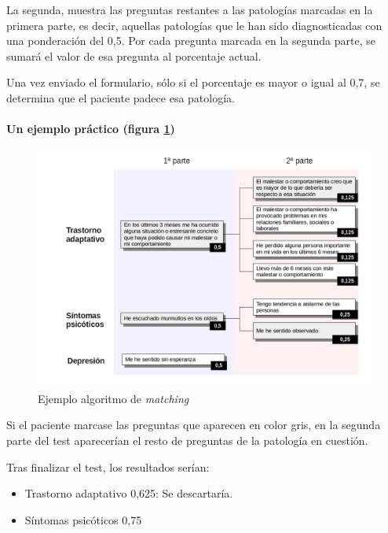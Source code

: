 La segunda, muestra las preguntas restantes a las patologías marcadas en la primera parte, es decir, aquellas patologías que le han sido diagnosticadas con una ponderación del 0,5. Por cada pregunta marcada en la segunda parte, se sumará el valor de esa pregunta al porcentaje actual.


Una vez enviado el formulario, sólo si el porcentaje es mayor o igual al 0,7, se determina que el paciente padece esa patología.


\paragraph{Un ejemplo práctico (figura \ref{ej_alg_match})}


\begin{figure}[htbp] 
    \centering
    \includegraphics[width=1\textwidth]{figuras/alg_matching.png}
    \caption{Ejemplo algoritmo de \textit{matching}}
    \label{ej_alg_match}
\end{figure}	

Si el paciente marcase las preguntas que aparecen en color gris, en la segunda parte del test aparecerían el resto de preguntas de la patología en cuestión.


Tras finalizar el test, los resultados serían:

\begin{itemize}
\item Trastorno adaptativo 0,625: Se descartaría.
\item Síntomas psicóticos 0,75
\end{itemize}


